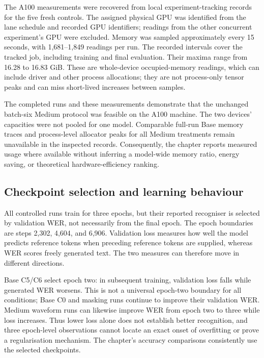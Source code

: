 \documentclass[12pt,a4paper]{report}
\begin{document}
The A100 measurements were recovered from local experiment-tracking records
for the five fresh controls. The assigned physical GPU was identified from
the lane schedule and recorded GPU identifiers; readings from the other
concurrent experiment's GPU were excluded. Memory was sampled approximately
every 15 seconds, with 1,681--1,849 readings per run. The recorded intervals
cover the tracked job, including training and final evaluation. Their maxima
range from 16.28 to 16.83 GiB. These are whole-device occupied-memory readings,
which can include driver and other process allocations; they are not
process-only tensor peaks and can miss short-lived increases between samples.

The completed runs and these measurements demonstrate that the unchanged
batch-six Medium protocol was feasible on the A100 machine. The two devices'
capacities were not pooled for one model. Comparable full-run Base memory
traces and process-level allocator peaks for all Medium treatments remain
unavailable in the inspected records. Consequently, the chapter reports
measured usage where available without inferring a model-wide memory ratio,
energy saving, or theoretical hardware-efficiency ranking.

\subsection{Checkpoint selection and learning behaviour}

All controlled runs train for three epochs, but their reported recogniser
is selected by validation WER, not necessarily from the final epoch.
The epoch boundaries are steps 2,302, 4,604, and 6,906. Validation loss
measures how well the model predicts reference tokens when preceding
reference tokens are supplied, whereas WER scores freely generated text.
The two measures can therefore move in different directions.

Base C5/C6 select epoch two: in subsequent training, validation loss falls
while generated WER worsens. This is not a universal epoch-two boundary
for all conditions; Base C0 and masking runs continue to improve their
validation WER. Medium waveform runs can likewise improve WER from epoch
two to three while loss increases. Thus lower loss alone does not establish
better recognition, and three epoch-level observations cannot locate an
exact onset of overfitting or prove a regularisation mechanism. The chapter's
accuracy comparisons consistently use the selected checkpoints.
\end{document}
